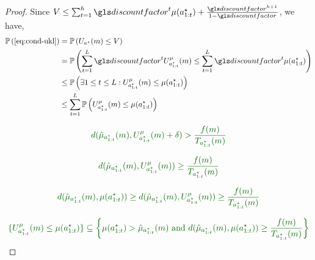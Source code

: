 \begin{proof}
	Since $V \leq \sum_{t=1}^h \discount^t \mu(a^{\star}_{1:t}) + \frac{\discount^{h+1}}{1-\discount}$, we have,
	\begin{align*}
	\probability{\eqref{eq:cond-ukl}} &=  \probability{U_{a^{\star}}(m) \leq V}\\
	&= \probability{\sum_{t=1}^L \discount^t U^{\mu}_{a^{\star}_{1:t}}(m) \leq \sum_{t=1}^L \discount^t \mu(a^{\star}_{1:t})}\\
	&\leq \probability{\exists 1\leq t \leq L : U^{\mu}_{a^{\star}_{1:t}}(m) \leq \mu(a^{\star}_{1:t})} \\
	&\leq \sum_{t=1}^L\probability{U^{\mu}_{a^{\star}_{1:t}}(m) \leq \mu(a^{\star}_{1:t})}
	\end{align*}
	
	
	\begin{equation*}
	\diff{d(\hat{\mu}_{a^{\star}_{1:t}}(m), U^{\mu}_{a^{\star}_{1:t}}(m)+\delta) > \frac{f(m)}{T_{a^{\star}_{1:t}}(m)}}
	\end{equation*}
	
	
	\begin{equation*}
	\diff{d(\hat{\mu}_{a^{\star}_{1:t}}(m), U^{\mu}_{a^{\star}_{1:t}}(m)) \geq \frac{f(m)}{T_{a^{\star}_{1:t}}(m)}}
	\end{equation*}
	
	
	\begin{equation*}
	\diff{d(\hat{\mu}_{a^{\star}_{1:t}}(m), \mu(a^{\star}_{1:t})) \geq d(\hat{\mu}_{a^{\star}_{1:t}}(m), U^{\mu}_{a^{\star}_{1:t}}(m)) \geq \frac{f(m)}{T_{a^{\star}_{1:t}}(m)}}
	\end{equation*}
	
	
	\begin{equation*}
	\diff{\{U^{\mu}_{a^{\star}_{1:t}}(m) \leq \mu(a^{\star}_{1:t})\} \subseteq \left\{ \mu(a^{\star}_{1:t}) > \hat{\mu}_{a^{\star}_{1:t}}(m) \text{ and } d(\hat{\mu}_{a^{\star}_{1:t}}(m), \mu(a^{\star}_{1:t})) \geq \frac{f(m)}{T_{a^{\star}_{1:t}}(m)} \right\}}
	\end{equation*}
	

\end{proof}
